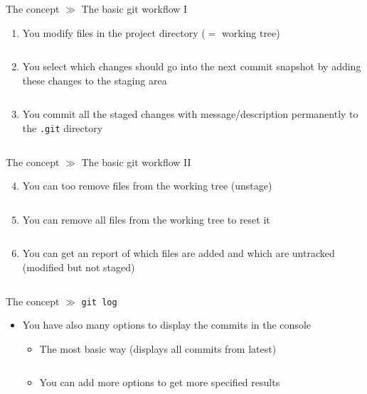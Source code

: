 \documentclass[10pt]{beamer}
\begin{document}
\begin{frame}{The concept $\gg$ The basic git workflow I}
\begin{enumerate}
	\item You modify files in the project directory ($=$ working tree) \\
	\inputminted[bgcolor=lightGreyCustom,fontsize=\scriptsize]{sh}{./resources/git_workflow_01_modify.sh}
	\item You select which changes should go into the next commit snapshot by adding these changes to the staging area \\
	\inputminted[bgcolor=lightGreyCustom,fontsize=\scriptsize]{sh}{./resources/git_workflow_02_stage.sh}
	\item You commit all the staged changes with message/description permanently to the \texttt{.git} directory \\
	\inputminted[bgcolor=lightGreyCustom,fontsize=\scriptsize]{sh}{./resources/git_workflow_03_commit.sh}
\end{enumerate}
\end{frame}

\begin{frame}{The concept $\gg$ The basic git workflow II}
\begin{enumerate}\setcounter{enumi}{3}
	\item You can too remove files from the working tree (unstage) \\
	\inputminted[bgcolor=lightGreyCustom,fontsize=\scriptsize]{sh}{./resources/git_workflow_04_unstage.sh}
	\item You can remove all files from the working tree to reset it\\
	\inputminted[bgcolor=lightGreyCustom,fontsize=\scriptsize]{sh}{./resources/git_workflow_05_reset.sh}
	\item You can get an report of which files are added and which are untracked (modified but not staged) \
	\inputminted[bgcolor=lightGreyCustom,fontsize=\scriptsize]{sh}{./resources/git_workflow_06_status.sh}
\end{enumerate}
\end{frame}

\begin{frame}{The concept $\gg$ \texttt{git log}}
\begin{itemize}
	\item You have also many options to display the commits in the console 
	\begin{itemize}
		\item The most basic way (displays all commits from latest)
		\inputminted[bgcolor=lightGreyCustom,fontsize=\scriptsize]{sh}{./resources/git_log_01_normal.sh}
		\item You can add more options to get more specified results\\
		\inputminted[bgcolor=lightGreyCustom,fontsize=\scriptsize]{sh}{./resources/git_log_02_options.sh}
	\end{itemize}
\end{itemize}
\end{frame}
\end{document}
